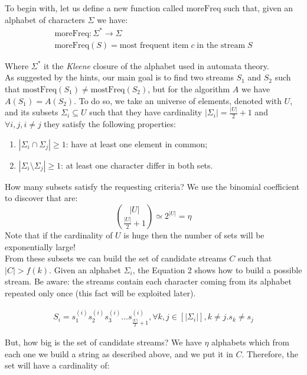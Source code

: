 \documentclass{article}
\begin{document}
To begin with, let us define a new function called $\textrm{moreFreq}$ such that, given an alphabet of characters $\Sigma$ we have:
\begin{gather*}
    \textrm{moreFreq}: \Sigma^{*} \to \Sigma \\
    \textrm{moreFreq}(S) = \textrm{most frequent item} \; c \; \textrm{in the stream} \; S
\end{gather*}

\noindent Where $\Sigma^{*}$ it the \textit{Kleene} closure of the alphabet used in automata theory.\\

\noindent As suggested by the hints, our main goal is to find two streams $S_1$ and $S_2$ such that $\textrm{mostFreq}(S_1) \ne \textrm{mostFreq}(S_2)$, 
but for the algorithm $A$ we have $A(S_1) = A(S_2)$. To do so, we take an universe of elements, denoted with $U$, and its subsets $\Sigma_i \subseteq U$ such
that they have cardinality $|\Sigma_i| = \frac{|U|}{2} + 1$ and $\forall i, j, i \ne j$ they satisfy the following properties:
\begin{enumerate}
    \item $|\Sigma_i \cap \Sigma_j| \ge 1$: have at least one element in common;
    \item $|\Sigma_i \setminus \Sigma_j| \ge 1$: at least one character differ in both sets.
\end{enumerate}

\noindent How many subsets satisfy the requesting criteria? We use the binomial coefficient to discover that are:
\begin{equation}
    \binom{|U|}{\frac{|U|}{2} + 1} \simeq 2^{|U|} = \eta
\end{equation}
Note that if the cardinality of $U$ is huge then the number of sets will be exponentially large!\\

\noindent From these subsets we can build the set of candidate streams $C$ such that $|C| > f(k)$. Given an alphabet $\Sigma_i$, the Equation 2 shows how to build
a possible stream. Be aware: the streams contain each character coming from its alphabet repeated
only once (this fact will be exploited later).

\begin{align}
    S_i = s_1^{(i)}s_2^{(i)}s_3^{(i)} \dots s_{\frac{|U|}{2} + 1}^{(i)}, \forall k, j \in [|\Sigma_i|], k \ne j. s_k \ne s_j
\end{align}

\noindent But, how big is the set of candidate streams? We have $\eta$ alphabets which from each one we build a string as described above, and we put it in $C$.
Therefore, the set will have a cardinality of:
\end{document}
